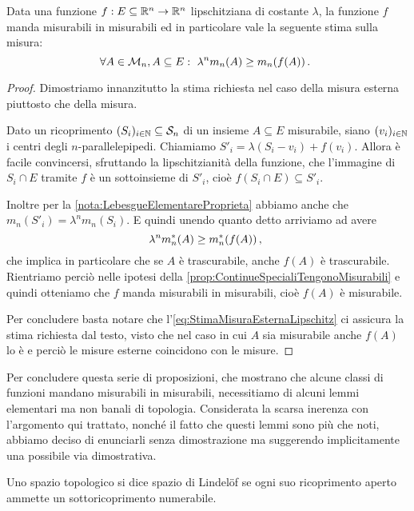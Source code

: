 \begin{proposition}\label{prop:LipschitzTengonoMisurabili}
	Data una funzione $f:E\subseteq \mathbb R^n\to\mathbb R^n$ lipschitziana di costante $\lambda$, la funzione $f$ manda misurabili in misurabili ed in particolare vale la seguente stima sulla misura:
	\begin{equation*}
		\forall A\in\mathcal M_n, A\subseteq E:\ \lambda^n m_n(A) \ge m_n(f(A)) \, \text{. }
	\end{equation*}
\end{proposition}
\begin{proof}
	Dimostriamo innanzitutto la stima richiesta nel caso della misura esterna piuttosto che della misura.
	
	Dato un ricoprimento $(S_i)_{i\in\mathbb N}\subseteq \mathcal S_n$ di un insieme $A\subseteq E$ misurabile, siano $(v_i)_{i\in\mathbb N}$ i centri degli $n$-parallelepipedi.
	Chiamiamo $S'_i=\lambda(S_i-v_i)+f(v_i)$.
	Allora è facile convincersi, sfruttando la lipschitzianità della funzione, che l'immagine di $S_i\cap E$ tramite $f$ è un sottoinsieme di $S'_i$, cioè $f(S_i\cap E)\subseteq S'_i$.
	
	Inoltre per la \cref{nota:LebesgueElementareProprieta} abbiamo anche che $m_n(S'_i)=\lambda^n m_n(S_i)$. 
	E quindi unendo quanto detto arriviamo ad avere
	\begin{equation}\label{eq:StimaMisuraEsternaLipschitz}
		\lambda^n m_n^*(A) \ge m_n^*(f(A))  \, \text{, }
	\end{equation}
	che implica in particolare che se $A$ è trascurabile, anche $f(A)$ è trascurabile.
	Rientriamo perciò nelle ipotesi della \cref{prop:ContinueSpecialiTengonoMisurabili} e quindi otteniamo che $f$ manda misurabili in misurabili, cioè $f(A)$ è misurabile.
	
	Per concludere basta notare che l'\cref{eq:StimaMisuraEsternaLipschitz} ci assicura la stima richiesta dal testo, visto che nel caso in cui $A$ sia misurabile anche $f(A)$ lo è e perciò le misure esterne coincidono con le misure.
\end{proof}

Per concludere questa serie di proposizioni, che mostrano che alcune classi di funzioni mandano misurabili in misurabili, necessitiamo di alcuni lemmi elementari ma non banali di topologia.
Considerata la scarsa inerenza con l'argomento qui trattato, nonché il fatto che questi lemmi sono più che noti, abbiamo deciso di enunciarli senza dimostrazione ma suggerendo implicitamente una possibile via dimostrativa.

\begin{definition}\label{def:Lindelof}
	Uno spazio topologico si dice spazio di Lindelöf se ogni suo ricoprimento aperto ammette un sottoricoprimento numerabile. 
\end{definition}

